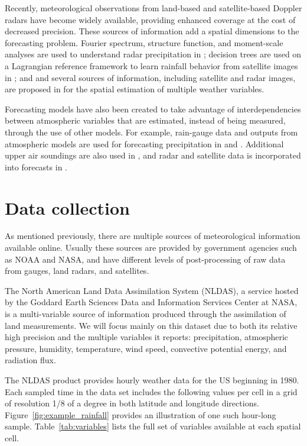 \documentclass{article}
\begin{document}
Recently, meteorological observations from land-based and satellite-based
Doppler radars have become widely available, providing enhanced coverage at
the cost of decreased precision. These sources of information add a spatial
dimensions to the forecasting problem. Fourier spectrum, structure function,
and moment-scale analyses are used to understand radar precipitation in
\cite{harris2007}; decision trees are used on a Lagrangian reference framework
to learn rainfall behavior from satellite images in \cite{Yang2007}; and and
several sources of information, including satellite and radar images, are
proposed in \cite{Bartok2010} for the spatial estimation of multiple weather
variables.

Forecasting models have also been created to take advantage
of interdependencies between atmospheric variables that are estimated,
instead of being measured, through the use of other models. For
example, rain-gauge data and outputs from atmospheric models are used for
forecasting precipitation in \cite{kuligowski1998} and \cite{ramirez2005}.
Additional upper air soundings are also used in \cite{Hall1999}, and radar and
satellite data is incorporated into forecasts in \cite{Koizumi1999}.

\section{Data collection}

As mentioned previously, there are multiple sources of meteorological
information available online. Usually these sources are provided by government
agencies such as NOAA and NASA, and have different levels of post-processing of
raw data from gauges, land radars, and satellites.

The North American Land Data Assimilation System (NLDAS), a service hosted by
the Goddard Earth Sciences Data and Information Services Center at NASA, is a
multi-variable source of information produced through the assimilation of land
measurements. We will focus mainly on this dataset due to both its relative high
precision and the multiple variables it reports: precipitation, atmospheric
pressure, humidity, temperature, wind speed, convective potential energy, and
radiation flux.

The NLDAS product provides hourly weather data for the US beginning in 1980.
Each sampled time in the data set includes the following values per cell in a
grid of resolution 1/8 of a degree in both latitude and longitude directions.
Figure~\ref{fig:example_rainfall} provides an illustration of one such hour-long
sample. Table~\ref{tab:variables} lists the full set of variables available at
each spatial cell.
\end{document}
